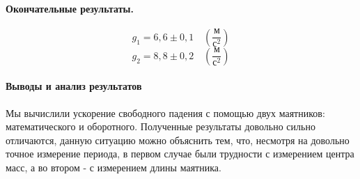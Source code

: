 \documentclass{article}
\begin{document}
\paragraph{Окончательные результаты.}
$$ g_1=6,6\pm0,1\quad\left(\frac{\mbox{м}}{\mbox{с}^2}\right)$$
$$ g_2=8,8\pm0,2\quad\left(\frac{\mbox{м}}{\mbox{с}^2}\right)$$

\paragraph{Выводы и анализ результатов}
Мы вычислили ускорение свободного падения с помощью двух маятников: математического и оборотного. Полученные результаты довольно сильно отличаются, данную ситуацию можно объяснить тем, что, несмотря на довольно точное измерение периода, в первом случае были трудности с измерением центра масс, а во втором - с измерением длины маятника.
\end{document}
